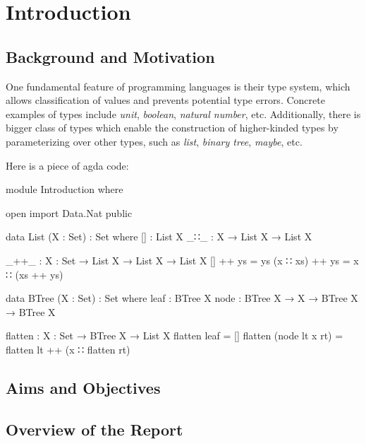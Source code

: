 \chapter{Introduction}

\section{Background and Motivation}

One fundamental feature of programming languages is their type system, which allows classification of values and prevents potential type errors. Concrete examples of types include \textit{unit}, \textit{boolean}, \textit{natural number}, etc. Additionally, there is bigger class of types which enable the construction of higher-kinded types by parameterizing over other types, such as \textit{list}, \textit{binary tree}, \textit{maybe}, etc.

Here is a piece of agda code:

\begin{code}[hide]
module Introduction where

open import Data.Nat public
\end{code}

\AgdaTarget{[]}
\AgdaTarget{++, \_++\_}
\begin{code}
data List (X : Set) : Set where
  []  : List X
  _∷_ : X → List X → List X  

_++_ : {X : Set} → List X → List X → List X
[] ++ ys = ys
(x ∷ xs) ++ ys = x ∷ (xs ++ ys)

data BTree (X : Set) : Set where
  leaf : BTree X
  node : BTree X → X → BTree X → BTree X

flatten : {X : Set} → BTree X → List X
flatten leaf = []
flatten (node lt x rt) = flatten lt ++ (x ∷ flatten rt)
\end{code}

\section{Aims and Objectives}

\section{Overview of the Report}

